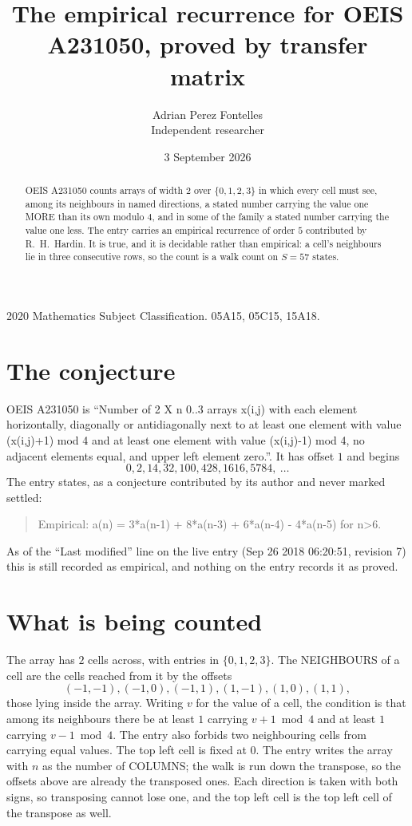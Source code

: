 \documentclass[11pt,a4paper]{article}
\title{The empirical recurrence for OEIS A231050, proved by transfer matrix}
\author{Adrian Perez Fontelles\\ \small Independent researcher}
\date{3 September 2026}
\theoremstyle{plain}
\theoremstyle{definition}
\begin{document}
\maketitle

\begin{abstract}
OEIS A231050 counts arrays of width $2$ over $\{0,1,2,3\}$ in which every cell must see, among its
neighbours in named directions, a stated number carrying the value one MORE than its own
modulo $4$, and in some of the family a stated number carrying the value one less. The entry
carries an empirical recurrence of order $5$ contributed by R.~H.~Hardin. It is true, and
it is decidable rather than empirical: a cell's neighbours lie in three consecutive rows, so
the count is a walk count on $S=57$ states.
\end{abstract}

\noindent\small 2020 Mathematics Subject Classification. 05A15, 05C15, 15A18.\normalsize

\section{The conjecture}

OEIS A231050 is ``Number of 2 X n 0..3 arrays x(i,j) with each element horizontally, diagonally or antidiagonally next to at least one element with value (x(i,j)+1) mod 4 and at least one element with value (x(i,j)-1) mod 4, no adjacent elements equal, and upper left element zero.''. It has offset $1$ and begins
\[
0, 2, 14, 32, 100, 428, 1616, 5784,\ \dots
\]
The entry states, as a conjecture contributed by its author and never marked settled:
\begin{quote}
Empirical: a(n) = 3*a(n-1) + 8*a(n-3) + 6*a(n-4) - 4*a(n-5) for n>6.
\end{quote}
As of the ``Last modified'' line on the live entry (Sep 26 2018 06:20:51, revision 7) this is still
recorded as empirical, and nothing on the entry records it as proved.

\section{What is being counted}

The array has $2$ cells across, with entries in $\{0,1,2,3\}$. The NEIGHBOURS of a cell are the
cells reached from it by the offsets
\[
(-1,-1), (-1,0), (-1,1), (1,-1), (1,0), (1,1),
\]
those lying inside the array. Writing $v$ for the value of a cell, the condition is that among
its neighbours there be at least $1$ carrying $v+1 \bmod 4$ and at least $1$ carrying $v-1 \bmod 4$. The entry also forbids two neighbouring cells from carrying equal values. The top left
cell is fixed at $0$. The entry writes the array with $n$ as the number of COLUMNS; the walk is run down the transpose, so the offsets above are already the transposed ones. Each direction is taken with both signs, so transposing cannot lose one, and the top left cell is the top left cell of the transpose as well.
\end{document}

